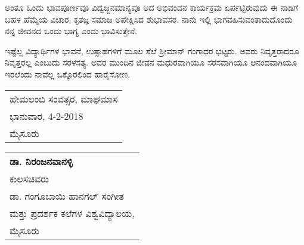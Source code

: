 ಅಂತೂ ಒಂದು ಭಾವಪೂರ್ಣವೂ ವಿದ್ವಜ್ಜನಮಾನ್ಯವೂ ಆದ ಅಭಿವಂದನ ಕಾರ್ಯಕ್ರಮ ಏರ್ಪಟ್ಟಿರುವುದು ಈ ನಾಡಿಗೆ ಬಹಳ ಹೆಮ್ಮೆಯ ವಿಚಾರ. ಕೃತಜ್ಞ ಸಮಾಜ ಅಪೇಕ್ಷಿಸಿದ ಶುಭಾವಸರ. ನಾನು ಇಲ್ಲಿ ಭಾಗವಹಿಸುವಂತಾದುದೊಂದು ನನ್ನ ಜೀವನದ ಒಂದು ಭಾಗ್ಯ ಎಂದು ಭಾವಿಸುತ್ತೇನೆ.

ಇಷ್ಟೆಲ್ಲ ವಿದ್ಯಾರ್ಥಿಗಳ ಭಾವನೆ, ಉತ್ಸಾಹಗಳಿಗೆ ಮೂಲ ಸೆಲೆ ಶ್ರೀಮಾನ್ ಗಂಗಾಧರ ಭಟ್ಟರು. ಅವರು ನಿವೃತ್ತರಾದರೂ ನಿವೃತ್ತರಲ್ಲ ಎಂಬುದು ಸರಳಸತ್ಯ. ಅವರ ಮುಂದಿನ ಜೀವನ ಮಧುರವಾಗಿಯೂ ಸರಸವಾಗಿಯೂ ಆನಂದವಾಗಿಯೂ  ಇರಲೆಂದು ನಾವೆಲ್ಲ ಒಕ್ಕೊರಲಿಂದ ಹಾರೈಸೋಣ.

\bigskip

\begin{tabular}{l}
ಹೇಮಲಂಬಿ ಸಂವತ್ಸರ, ಮಾಘಮಾಸ\\
ಭಾನುವಾರ, 4-2-2018\\
ಮೈಸೂರು
\end{tabular}\hfill                        
\begin{tabular}{l}
\textbf{ಡಾ. ನಿರಂಜನವಾನಳ್ಳಿ}\\            						 
ಕುಲಸಚಿವರು\\ 
ಡಾ. ಗಂಗೂಬಾಯಿ ಹಾನಗಲ್ ಸಂಗೀತ \\
ಮತ್ತು ಪ್ರದರ್ಶಕ ಕಲೆಗಳ ವಿಶ್ವವಿದ್ಯಾಲಯ,\\ 
ಮೈಸೂರು
\end{tabular}
